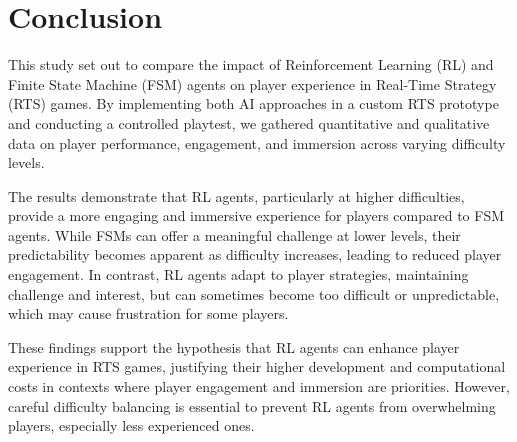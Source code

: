 \documentclass[conference]{IEEEtran}
\begin{document}

\section{Conclusion}

This study set out to compare the impact of Reinforcement Learning (RL) and Finite State Machine (FSM) agents on player experience in Real-Time Strategy (RTS) games.
By implementing both AI approaches in a custom RTS prototype and conducting a controlled playtest, we gathered quantitative and qualitative data on player performance, engagement,
and immersion across varying difficulty levels.

The results demonstrate that RL agents, particularly at higher difficulties, provide a more engaging and immersive experience for players compared to FSM agents.
While FSMs can offer a meaningful challenge at lower levels, their predictability becomes apparent as difficulty increases, leading to reduced player engagement. In contrast, RL agents adapt to player strategies, maintaining challenge and interest, but can sometimes become too difficult or unpredictable, which may cause frustration for some players.

These findings support the hypothesis that RL agents can enhance player experience in RTS games, justifying their higher development and computational costs in contexts where player engagement and
immersion are priorities. However, careful difficulty balancing is essential to prevent RL agents from overwhelming players, especially less experienced ones.



\end{document}
